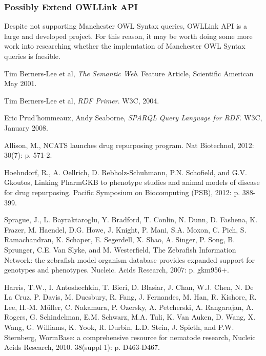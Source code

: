 \documentclass{article}
\begin{document}
\subsubsection{Possibly Extend OWLLink API}

Despite not supporting Manchester OWL Syntax queries, OWLLink API is a large and
developed project. For this reason, it may be worth doing some
more work into researching whether the implemtation of Manchester OWL Syntax
queries is faesible.

\begin{thebibliography}{9}

  Tim Berners-Lee et al,
  \emph{The Semantic Web}.
  Feature Article, Scientific American
  May 2001.

 Tim Berners-Lee et al,
 \emph{RDF Primer}.
 W3C,
 2004.

  Eric Prud'hommeaux, Andy Seaborne,
  \emph{SPARQL Query Language for RDF}.
  W3C,
  January 2008.

  Allison, M., NCATS launches drug repurposing program.
  Nat Biotechnol,
  2012: 30(7): p. 571-2.
  
  Hoehndorf, R., A. Oellrich, D. Rebholz-Schuhmann, P.N. Schofield, and G.V. Gkoutos,
  Linking PharmGKB to phenotype studies and animal models of disease for drug repurposing. 
  Pacific Symposium on Biocomputing (PSB), 
  2012: p. 388-399.

  Sprague, J., L. Bayraktaroglu, Y. Bradford, T. Conlin, N. Dunn, D. Fashena, K. Frazer, M. Haendel, D.G. Howe, J. Knight, P. Mani, S.A. Moxon, C. Pich, S. Ramachandran, K. Schaper, E. Segerdell, X. Shao, A. Singer, P. Song, B. Sprunger, C.E. Van Slyke, and M. Westerfield, 
  The Zebrafish Information Network: the zebrafish model organism database provides expanded support for genotypes and phenotypes. 
  Nucleic. Acids Research,
  2007: p. gkm956+.

  Harris, T.W., I. Antoshechkin, T. Bieri, D. Blasiar, J. Chan, W.J. Chen, N. De La Cruz, P. Davis, M. Duesbury, R. Fang, J. Fernandes, M. Han, R. Kishore, R. Lee, H.-M. M\"uller, C. Nakamura, P. Ozersky, A. Petcherski, A. Rangarajan, A. Rogers, G. Schindelman, E.M. Schwarz, M.A. Tuli, K. Van Auken, D. Wang, X. Wang, G. Williams, K. Yook, R. Durbin, L.D. Stein, J. Spieth, and P.W. Sternberg, 
  WormBase: a comprehensive resource for nematode research,
  Nucleic Acids Research,
  2010. 38(suppl 1): p. D463-D467.


\end{thebibliography}
\end{document}
